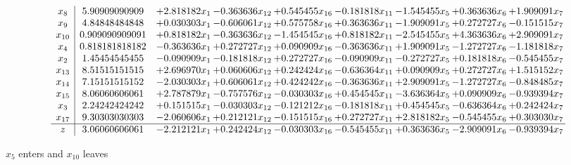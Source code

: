 \documentclass[10pt]{article}
\begin{document}
 \[\begin{array}{c| c c@{\hskip 2pt} c@{\hskip 2pt} c@{\hskip 2pt} c@{\hskip 2pt} c@{\hskip 2pt} c@{\hskip 2pt} c@{\hskip 2pt} }
 x_{8}   &  5.90909090909 & + 2.818182 x_{1} & -0.363636 x_{12} & + 0.545455 x_{16} & -0.181818 x_{11} & -1.545455 x_{5} & + 0.363636 x_{6} & + 1.909091 x_{7}\\
 x_{9}   &  4.84848484848 & + 0.030303 x_{1} & -0.606061 x_{12} & + 0.575758 x_{16} & + 0.363636 x_{11} & -1.909091 x_{5} & + 0.272727 x_{6} & -0.151515 x_{7}\\
 x_{10}   &  0.909090909091 & + 0.818182 x_{1} & -0.363636 x_{12} & -1.454545 x_{16} & + 0.818182 x_{11} & -2.545455 x_{5} & + 4.363636 x_{6} & + 2.909091 x_{7}\\
 x_{4}   &  0.818181818182 & -0.363636 x_{1} & + 0.272727 x_{12} & + 0.090909 x_{16} & -0.363636 x_{11} & + 1.909091 x_{5} & -1.272727 x_{6} & -1.181818 x_{7}\\
 x_{2}   &  1.45454545455 & -0.090909 x_{1} & -0.181818 x_{12} & + 0.272727 x_{16} & -0.090909 x_{11} & -0.272727 x_{5} & + 0.181818 x_{6} & -0.545455 x_{7}\\
 x_{13}   &  8.51515151515 & + 2.696970 x_{1} & + 0.060606 x_{12} & + 0.242424 x_{16} & -0.636364 x_{11} & + 0.090909 x_{5} & + 0.272727 x_{6} & + 1.515152 x_{7}\\
 x_{14}   &  7.15151515152 & -2.030303 x_{1} & + 0.606061 x_{12} & + 0.424242 x_{16} & -0.363636 x_{11} & + 2.909091 x_{5} & -1.272727 x_{6} & -0.848485 x_{7}\\
 x_{15}   &  8.06060606061 & + 2.787879 x_{1} & -0.757576 x_{12} & -0.030303 x_{16} & + 0.454545 x_{11} & -3.636364 x_{5} & + 0.090909 x_{6} & -0.939394 x_{7}\\
 x_{3}   &  2.24242424242 & + 0.151515 x_{1} & -0.030303 x_{12} & -0.121212 x_{16} & -0.181818 x_{11} & + 0.454545 x_{5} & -0.636364 x_{6} & + 0.242424 x_{7}\\
 x_{17}   &  9.30303030303 & -2.060606 x_{1} & + 0.212121 x_{12} & -0.151515 x_{16} & + 0.272727 x_{11} & + 2.818182 x_{5} & -0.545455 x_{6} & + 0.303030 x_{7}\\
\hline
z    &  3.06060606061 & -2.212121 x_{1} & + 0.242424 x_{12} & -0.030303 x_{16} & -0.545455 x_{11} & + 0.363636 x_{5} & -2.909091 x_{6} & -0.939394 x_{7}\\
\end{array}\]


 $ x_{5} $ enters and $ x_{10} $ leaves 
\end{document}
